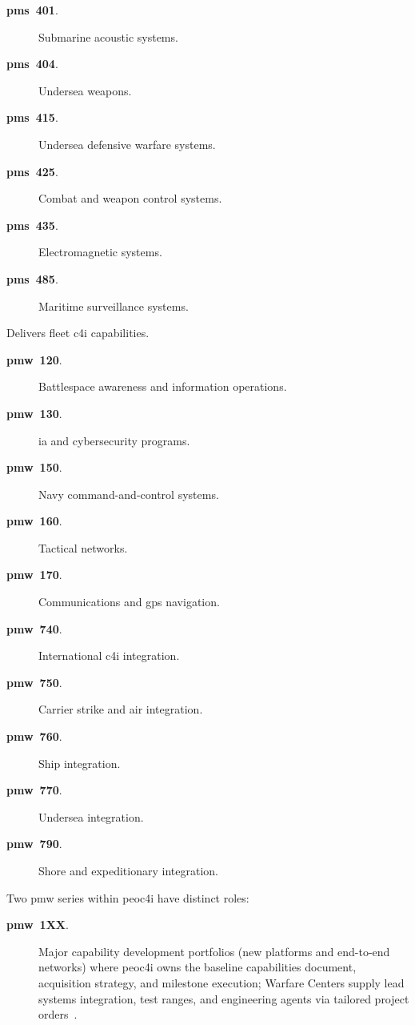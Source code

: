 \documentclass[../main.tex]{subfiles}
\begin{document}
\begin{description}
\begin{description}
\begin{description}
                    \item[\textbf{\ac{pms}~401}.] Submarine acoustic systems.
                    \item[\textbf{\ac{pms}~404}.] Undersea weapons.
                    \item[\textbf{\ac{pms}~415}.] Undersea defensive warfare systems.
                    \item[\textbf{\ac{pms}~425}.] Combat and weapon control systems.
                    \item[\textbf{\ac{pms}~435}.] Electromagnetic systems.
                    \item[\textbf{\ac{pms}~485}.] Maritime surveillance systems.
                  \end{description}
          \end{description}
    \item[\textbf{\ac{peoc4i}.}] Delivers fleet \ac{c4i} capabilities.
          \begin{description}
            \item[\textbf{\ac{pmw}~120}.] Battlespace awareness and information operations.
            \item[\textbf{\ac{pmw}~130}.] \ac{ia} and cybersecurity programs.
            \item[\textbf{\ac{pmw}~150}.] Navy command-and-control systems.
            \item[\textbf{\ac{pmw}~160}.] Tactical networks.
            \item[\textbf{\ac{pmw}~170}.] Communications and \ac{gps} navigation.
            \item[\textbf{\ac{pmw}~740}.] International \ac{c4i} integration.
            \item[\textbf{\ac{pmw}~750}.] Carrier strike and air integration.
            \item[\textbf{\ac{pmw}~760}.] Ship integration.
            \item[\textbf{\ac{pmw}~770}.] Undersea integration.
            \item[\textbf{\ac{pmw}~790}.] Shore and expeditionary integration.
          \end{description}
    \item[\textbf{\ac{pmw} series focus.}] Two \ac{pmw} series within \ac{peoc4i} have distinct roles:
          \begin{description}
            \item[\textbf{\ac{pmw}~1XX}.] Major capability development portfolios (new platforms and end-to-end networks) where \ac{peoc4i} owns the baseline capabilities document, acquisition strategy, and milestone execution; Warfare Centers supply lead systems integration, test ranges, and engineering agents via tailored project orders~\autocite{SECNAV5400-15D,edo-2-1-4-warfare-centers-2024}.

\end{description}
\end{description}
\end{document}
